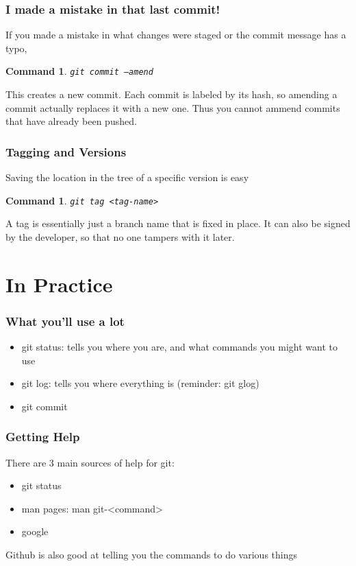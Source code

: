 \documentclass{beamer}
\newtheorem{command}[theorem]{Command}
\begin{document}
\begin{frame}
    \frametitle{I made a mistake in that last commit!}
    If you made a mistake in what changes were staged or the commit message has a typo,
    \begin{command}
        \texttt{git commit --amend}
    \end{command}
    \pause
    \alert{This creates a new commit}. Each commit is labeled by its hash, so amending a commit actually replaces it with a new one. Thus you cannot ammend commits that have already been pushed.
\end{frame}

\begin{frame}
    \frametitle{Tagging and Versions}
    Saving the location in the tree of a specific version is easy
    \begin{command}
        \texttt{git tag <tag-name>}
    \end{command}
    A tag is essentially just a branch name that is fixed in place. It can also be signed by the developer, so that no one tampers with it later.
\end{frame}

\section{In Practice}

\begin{frame}
    \frametitle{What you'll use a lot}
    \begin{itemize}
        \item git status: tells you where you are, and what commands you might want to use
        \item git log: tells you where everything is (reminder: git glog)
        \item git commit
    \end{itemize}
\end{frame}


\begin{frame}
    \frametitle{Getting Help}
    There are 3 main sources of help for git:
    \begin{itemize}
        \item git status
        \item man pages: man git-<command>
        \item google
    \end{itemize}
    Github is also good at telling you the commands to do various things
\end{frame}
\end{document}
